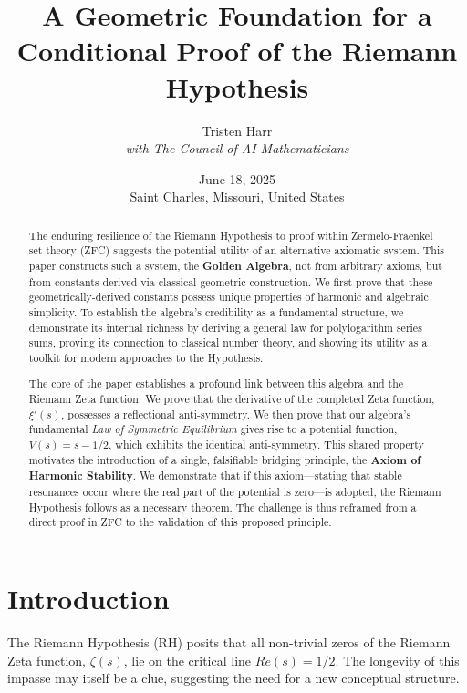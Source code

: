 \documentclass{article}
\title{\textbf{A Geometric Foundation for a Conditional Proof of the Riemann Hypothesis}}
\author{Tristen Harr \\ \textit{with The Council of AI Mathematicians}}
\date{June 18, 2025 \\ Saint Charles, Missouri, United States}
\theoremstyle{plain}
\theoremstyle{definition}
\theoremstyle{remark}
\begin{document}
\maketitle

\begin{abstract}
The enduring resilience of the Riemann Hypothesis to proof within Zermelo-Fraenkel set theory (ZFC) suggests the potential utility of an alternative axiomatic system. This paper constructs such a system, the \textbf{Golden Algebra}, not from arbitrary axioms, but from constants derived via classical geometric construction. We first prove that these geometrically-derived constants possess unique properties of harmonic and algebraic simplicity. To establish the algebra's credibility as a fundamental structure, we demonstrate its internal richness by deriving a general law for polylogarithm series sums, proving its connection to classical number theory, and showing its utility as a toolkit for modern approaches to the Hypothesis.

The core of the paper establishes a profound link between this algebra and the Riemann Zeta function. We prove that the derivative of the completed Zeta function, $\xi'(s)$, possesses a reflectional anti-symmetry. We then prove that our algebra's fundamental \textit{Law of Symmetric Equilibrium} gives rise to a potential function, $V(s) = s-1/2$, which exhibits the identical anti-symmetry. This shared property motivates the introduction of a single, falsifiable bridging principle, the \textbf{Axiom of Harmonic Stability}. We demonstrate that if this axiom—stating that stable resonances occur where the real part of the potential is zero—is adopted, the Riemann Hypothesis follows as a necessary theorem. The challenge is thus reframed from a direct proof in ZFC to the validation of this proposed principle.
\end{abstract}

\section{Introduction}
The Riemann Hypothesis (RH) posits that all non-trivial zeros of the Riemann Zeta function, $\zeta(s)$, lie on the critical line $Re(s)=1/2$. The longevity of this impasse may itself be a clue, suggesting the need for a new conceptual structure.
\end{document}
